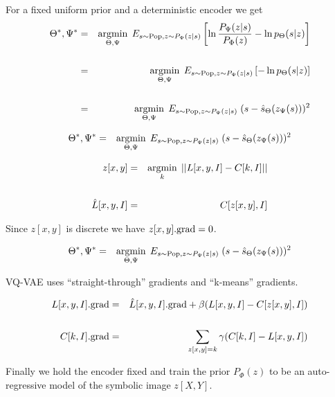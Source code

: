 {{}



For a fixed uniform prior and a deterministic encoder we get
{\huge
\begin{eqnarray*}
\Theta^*,\Psi^* &  = & \operatorname*{argmin}_{\Theta,\Psi}\;E_{s\sim \mathrm{Pop},z\sim P_\Psi(z|s)}\left[\ln \frac{P_\Psi(z|s)}{P_\Phi(z)}  - \ln p_\Theta(s|z)\right] \\
\\
& = & \operatorname*{argmin}_{\Theta,\Psi}\;E_{s\sim \mathrm{Pop},z\sim P_\Psi(z|s)}\left[- \ln p_\Theta(s|z)\right] \\
\\
& = & \operatorname*{argmin}_{\Theta,\Psi}\;E_{s\sim \mathrm{Pop},z\sim P_\Psi(z|s)} \;(s - \hat{s}_\Theta(z_\Psi(s)))^2
\end{eqnarray*}
}


{\huge
\begin{eqnarray*}
\Theta^*,\Psi^* & = & \operatorname*{argmin}_{\Theta,\Psi}\;E_{s\sim \mathrm{Pop},z\sim P_\Psi(z|s)} \;(s - \hat{s}_\Theta(z_\Psi(s)))^2 
\end{eqnarray*}

\begin{eqnarray*}
z[x,y] & = & \operatorname*{argmin}_k \;||L[x,y,I] - C[k,I]|| \\
\\
\hat{L}[x,y,I] & = & C[z[x,y],I]
\end{eqnarray*}
}

\vfill
Since $z[x,y]$ is discrete we have $z[x,y].\mathrm{grad} = 0$.

{\huge
\begin{eqnarray*}
\Theta^*,\Psi^* & = & \operatorname*{argmin}_{\Theta,\Psi}\;E_{s\sim \mathrm{Pop},z\sim P_\Psi(z|s)} \;(s - \hat{s}_\Theta(z_\Psi(s)))^2 
\end{eqnarray*}
}

VQ-VAE uses ``straight-through'' gradients and ``k-means'' gradients.

{\huge
\begin{eqnarray*}
L[x,y,I].\mathrm{grad} & = & \hat{L}[x,y,I].\mathrm{grad} + \beta(L[x,y,I] - C[z[x,y],I]) \\
\\
C[k,I].\mathrm{grad} & = & \sum_{z[x,y]=k} \gamma(C[k,I] - L[x,y,I])
\end{eqnarray*}
}


Finally we hold the encoder fixed and train the prior $P_\Phi(z)$ to be an auto-regressive model of the symbolic image $z[X,Y]$.

}
